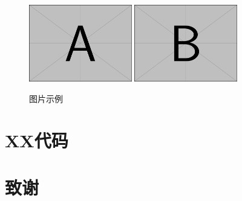 \documentclass{swufethesis}
\begin{document}
\begin{figure}[htb]
  \centering
  \includegraphics[width=0.4\textwidth]{figures/example-image-a.pdf}
  \includegraphics[width=0.4\textwidth]{figures/example-image-b.pdf}
  \caption{图片示例}
\end{figure}

\printbibliography
\appendix
\chapter{XX代码}
\chapter{致谢}
\end{document}
